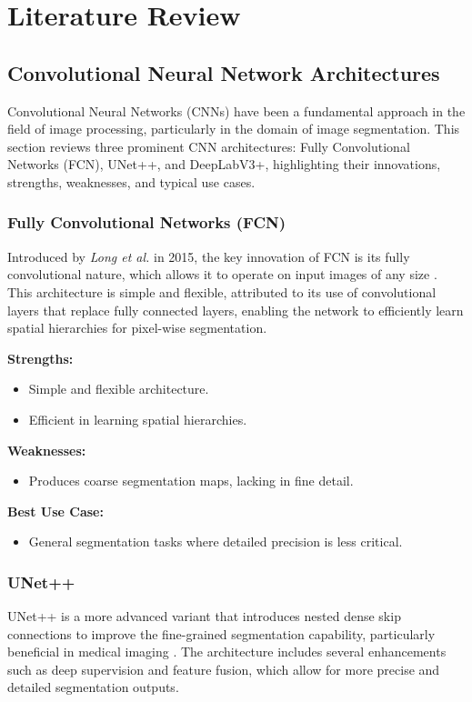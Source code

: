 \section{Literature Review}
\label{sec:literature}

\subsection{Convolutional Neural Network Architectures}
Convolutional Neural Networks (CNNs) have been a fundamental approach in the field of image processing, particularly in the domain of image segmentation. This section reviews three prominent CNN architectures: Fully Convolutional Networks (FCN), UNet++, and DeepLabV3+, highlighting their innovations, strengths, weaknesses, and typical use cases.

\subsubsection{Fully Convolutional Networks (FCN)}
Introduced by \textit{Long et al.} in 2015, the key innovation of FCN is its fully convolutional nature, which allows it to operate on input images of any size \cite{long2015fcn}. This architecture is simple and flexible, attributed to its use of convolutional layers that replace fully connected layers, enabling the network to efficiently learn spatial hierarchies for pixel-wise segmentation.

\noindent \textbf{Strengths:}
\begin{itemize}
  \item Simple and flexible architecture.
  \item Efficient in learning spatial hierarchies.
\end{itemize}

\noindent \textbf{Weaknesses:}
\begin{itemize}
  \item Produces coarse segmentation maps, lacking in fine detail.
\end{itemize}

\noindent \textbf{Best Use Case:}
\begin{itemize}
  \item General segmentation tasks where detailed precision is less critical.
\end{itemize}

\subsubsection{UNet++}
UNet++ is a more advanced variant that introduces nested dense skip connections to improve the fine-grained segmentation capability, particularly beneficial in medical imaging \cite{zhou2019unet++}. The architecture includes several enhancements such as deep supervision and feature fusion, which allow for more precise and detailed segmentation outputs.

